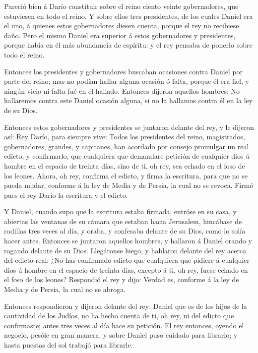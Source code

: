  Pareció bien á Darío constituir sobre el reino ciento
veinte gobernadores, que estuviesen en todo el reino.  Y
sobre ellos tres presidentes, de los cuales Daniel era el uno, á quienes
estos gobernadores diesen cuenta, porque el rey no recibiese daño.
 Pero el mismo Daniel era superior á estos gobernadores y
presidentes, porque había en él más abundancia de espíritu: y el rey
pensaba de ponerlo sobre todo el reino.

 Entonces los presidentes y gobernadores buscaban ocasiones
contra Daniel por parte del reino; mas no podían hallar alguna ocasión ó
falta, porque él era fiel, y ningún vicio ni falta fué en él hallado.
 Entonces dijeron aquellos hombres: No hallaremos contra
este Daniel ocasión alguna, si no la hallamos contra él en la ley de su
Dios.

 Entonces estos gobernadores y presidentes se juntaron
delante del rey, y le dijeron así: Rey Darío, para siempre vive:
 Todos los presidentes del reino, magistrados, gobernadores,
grandes, y capitanes, han acordado por consejo promulgar un real edicto,
y confirmarlo, que cualquiera que demandare petición de cualquier dios ú
hombre en el espacio de treinta días, sino de ti, oh rey, sea echado en
el foso de los leones.  Ahora, oh rey, confirma el edicto, y
firma la escritura, para que no se pueda mudar, conforme á la ley de
Media y de Persia, la cual no se revoca.  Firmó pues el rey
Darío la escritura y el edicto.

 Y Daniel, cuando supo que la escritura estaba firmada,
entróse en su casa, y abiertas las ventanas de su cámara que estaban
hacia Jerusalem, hincábase de rodillas tres veces al día, y oraba, y
confesaba delante de su Dios, como lo solía hacer antes. 
Entonces se juntaron aquellos hombres, y hallaron á Daniel orando y
rogando delante de su Dios.  Llegáronse luego, y hablaron
delante del rey acerca del edicto real: ¿No has confirmado edicto que
cualquiera que pidiere á cualquier dios ú hombre en el espacio de
treinta días, excepto á ti, oh rey, fuese echado en el foso de los
leones? Respondió el rey y dijo: Verdad es, conforme á la ley de Media y
de Persia, la cual no se abroga.

 Entonces respondieron y dijeron delante del rey: Daniel
que es de los hijos de la cautividad de los Judíos, no ha hecho cuenta
de ti, oh rey, ni del edicto que confirmaste; antes tres veces al día
hace su petición.  El rey entonces, oyendo el negocio,
pesóle en gran manera, y sobre Daniel puso cuidado para librarlo; y
hasta puestas del sol trabajó para librarle.

